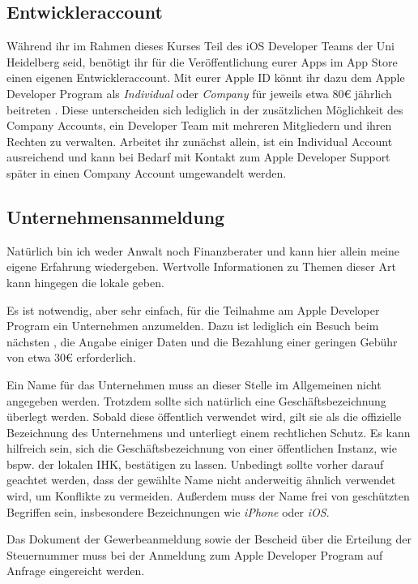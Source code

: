 \documentclass[parskip=half, final]{scrreprt}
\begin{document}
\subsection{Entwickleraccount}

Während ihr im Rahmen dieses Kurses Teil des iOS Developer Teams der Uni Heidelberg seid, benötigt ihr für die Veröffentlichung eurer Apps im App Store einen eigenen Entwickleraccount. Mit eurer Apple ID könnt ihr dazu dem Apple Developer Program als \emph{Individual} oder \emph{Company} für jeweils etwa 80€ jährlich beitreten . Diese unterscheiden sich lediglich in der zusätzlichen Möglichkeit des Company Accounts, ein Developer Team mit mehreren Mitgliedern und ihren Rechten zu verwalten. Arbeitet ihr zunächst allein, ist ein Individual Account ausreichend und kann bei Bedarf mit Kontakt zum Apple Developer Support später in einen Company Account umgewandelt werden.


\subsection{Unternehmensanmeldung}

 Natürlich bin ich weder Anwalt noch Finanzberater und kann hier allein meine eigene Erfahrung wiedergeben. Wertvolle Informationen zu Themen dieser Art kann hingegen die lokale  geben.

Es ist notwendig, aber sehr einfach, für die Teilnahme am Apple Developer Program ein Unternehmen anzumelden. Dazu ist lediglich ein Besuch beim nächsten , die Angabe einiger Daten und die Bezahlung einer geringen Gebühr von etwa 30€ erforderlich.

Ein Name für das Unternehmen muss an dieser Stelle im Allgemeinen nicht angegeben werden. Trotzdem sollte sich natürlich eine Geschäftsbezeichnung überlegt werden. Sobald diese öffentlich verwendet wird, gilt sie als die offizielle Bezeichnung des Unternehmens und unterliegt einem rechtlichen Schutz. Es kann hilfreich sein, sich die Geschäftsbezeichnung von einer öffentlichen Instanz, wie bspw. der lokalen IHK, bestätigen zu lassen. Unbedingt sollte vorher darauf geachtet werden, dass der gewählte Name nicht anderweitig ähnlich verwendet wird, um Konflikte zu vermeiden. Außerdem muss der Name frei von geschützten Begriffen sein, insbesondere Bezeichnungen wie \emph{iPhone} oder \emph{iOS}.

Das Dokument der Gewerbeanmeldung sowie der Bescheid über die Erteilung der Steuernummer muss bei der Anmeldung zum Apple Developer Program auf Anfrage eingereicht werden.
\end{document}
